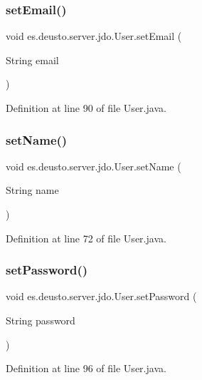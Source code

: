 \subsubsection{\texorpdfstring{setEmail()}{setEmail()}}
{\footnotesize\ttfamily void es.\+deusto.\+server.\+jdo.\+User.\+set\+Email (\begin{DoxyParamCaption}\item[{String}]{email }\end{DoxyParamCaption})}



Definition at line 90 of file User.\+java.

\mbox{\label{classes_1_1deusto_1_1server_1_1jdo_1_1_user_a1684a5a2d021ec4c3137a46a4e76d0c7}} 
\subsubsection{\texorpdfstring{setName()}{setName()}}
{\footnotesize\ttfamily void es.\+deusto.\+server.\+jdo.\+User.\+set\+Name (\begin{DoxyParamCaption}\item[{String}]{name }\end{DoxyParamCaption})}



Definition at line 72 of file User.\+java.

\mbox{\label{classes_1_1deusto_1_1server_1_1jdo_1_1_user_a2e052b5a7cab949f61580edf44bbd233}} 
\subsubsection{\texorpdfstring{setPassword()}{setPassword()}}
{\footnotesize\ttfamily void es.\+deusto.\+server.\+jdo.\+User.\+set\+Password (\begin{DoxyParamCaption}\item[{String}]{password }\end{DoxyParamCaption})}



Definition at line 96 of file User.\+java.

